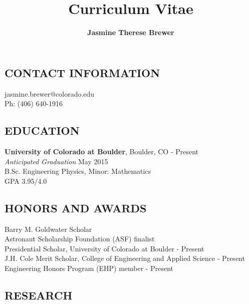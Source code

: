 \documentclass[11pt,a4paper]{article}
\title{\textbf{Curriculum Vitae}}
\author{\textbf{Jasmine Therese Brewer}}
\date{}
\begin{document}
\maketitle

\subsection*{CONTACT INFORMATION}

\begin{minipage}{0.48\textwidth}
jasmine.brewer@colorado.edu \\
Ph: (406) 640-1916
\end{minipage}%
\hfill
\begin{minipage}{0.45\textwidth}
\end{minipage}%

\subsection*{EDUCATION}

\textbf{University of Colorado at Boulder}, Boulder, CO  - Present \\
\textit{Anticipated Graduation} May 2015 \\
B.Sc. Engineering Physics, Minor: Mathematics \\
GPA 3.95/4.0

\subsection*{HONORS AND AWARDS}

Barry M. Goldwater Scholar  \\
Astronaut Scholarship Foundation (ASF) finalist  \\
Presidential Scholar, University of Colorado at Boulder  - Present \\
J.H. Cole Merit Scholar, College of Engineering and Applied Science  - Present \\
Engineering Honors Program (EHP) member  - Present \\

\subsection*{RESEARCH}
\end{document}
